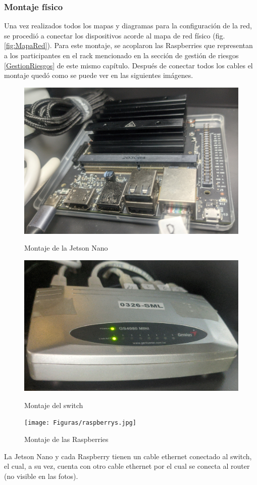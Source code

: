 \subsubsection{Montaje físico}
Una vez realizados todos los mapas y diagramas para la configuración de la red, se procedió a conectar los dispositivos acorde al mapa de red físico (fig. \ref{fig:MapaRed}). Para este montaje, se acoplaron las Raspberries que representan a los participantes en el rack mencionado en la sección de gestión de riesgos \ref{GestionRiesgos} de este mismo capítulo. Después de conectar todos los cables el montaje quedó como se puede ver en las siguientes imágenes.
\begin{figure}[H]
    \centering
    \begin{minipage}[t]{0.49\linewidth}  %
        \includegraphics[height=0.2\textheight]{Figuras/jetsonnano.jpg}
        \caption{Montaje de la Jetson Nano} 
    \end{minipage}
    \hfill
    \begin{minipage}[t]{0.5\linewidth}  %
        \includegraphics[height=0.2\textheight]{Figuras/switch.jpg}
        \caption{Montaje del switch} 
    \end{minipage}

    \texttt{[image: Figuras/raspberrys.jpg]}
    \caption{Montaje de las Raspberries}     
\end{figure}

La Jetson Nano y cada Raspberry tienen un cable ethernet conectado al switch, el cual, a su vez, cuenta con otro cable ethernet por el cual se conecta al router (no visible en las fotos).
